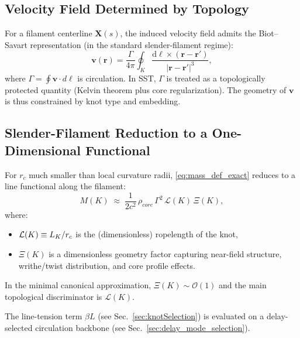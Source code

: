 \documentclass[10pt]{article}
\newcommand{\rhocore}{\rho_{core}}
\begin{document}
    \subsection{Velocity Field Determined by Topology}

        For a filament centerline $\mathbf{X}(s)$, the induced velocity field admits the
        Biot--Savart representation (in the standard slender-filament regime):
        \begin{equation}
            \mathbf{v}(\mathbf{r})
            =
            \frac{\Gamma}{4\pi}\oint_K
            \frac{\mathrm{d}\boldsymbol{\ell}\times(\mathbf{r}-\mathbf{r}')}{|\mathbf{r}-\mathbf{r}'|^3},
        \end{equation}
        where $\Gamma=\oint\mathbf{v}\cdot d\boldsymbol{\ell}$ is circulation. In SST,
        $\Gamma$ is treated as a topologically protected quantity (Kelvin theorem plus
        core regularization). The geometry of $\mathbf{v}$ is thus constrained by knot
        type and embedding.

    \subsection{Slender-Filament Reduction to a One-Dimensional Functional}

        For $r_c$ much smaller than local curvature radii, \eqref{eq:mass_def_exact}
        reduces to a line functional along the filament:
        \begin{equation}
            M(K)
            \;\approx\;
            \frac{1}{2c^2}\,
            \rhocore\,\Gamma^2\,\mathcal{L}(K)\,\Xi(K),
            \label{eq:mass_slender}
        \end{equation}
        where:
        \begin{itemize}
            \item $\mathcal{L}(K)\equiv L_K/r_c$ is the (dimensionless) ropelength of the knot,
            \item $\Xi(K)$ is a dimensionless geometry factor capturing near-field structure,
            writhe/twist distribution, and core profile effects.
        \end{itemize}
        In the minimal canonical approximation, $\Xi(K)\sim \mathcal{O}(1)$ and the main
        topological discriminator is $\mathcal{L}(K)$.
        
        The line-tension term $\beta L$ (see Sec.~\ref{sec:knotSelection}) is evaluated on a delay-selected circulation backbone (see Sec.~\ref{sec:delay_mode_selection}).
\end{document}

